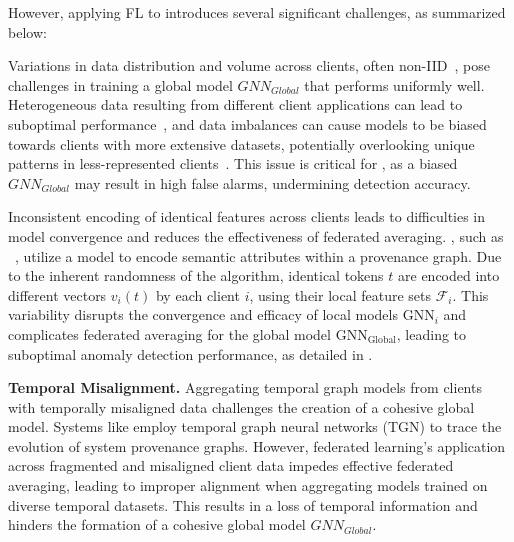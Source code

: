 However, applying FL to \pids introduces several significant challenges, as summarized below:

\begin{enumerate}[itemsep=0.1em, parsep=0em, topsep=0em, leftmargin=*]
   Variations in data distribution and volume across clients, often non-IID~\cite{zhao2018federated}, pose challenges in training a global model \( GNN_{Global} \) that performs uniformly well. Heterogeneous data resulting from different client applications can lead to suboptimal performance~\cite{qu2022rethinking}, and data imbalances can cause models to be biased towards clients with more extensive datasets, potentially overlooking unique patterns in less-represented clients~\cite{duan2020self}. This issue is critical for \pids, as a biased \( GNN_{Global} \) may result in high false alarms, undermining detection accuracy.

   Inconsistent encoding of identical features across clients leads to difficulties in model convergence and reduces the effectiveness of federated averaging. \pids, such as \flash~\cite{cheng2023kairos}, utilize a \wordvec model to encode semantic attributes within a provenance graph. Due to the inherent randomness of the \wordvec algorithm, identical tokens \( t \) are encoded into different vectors \( v_i(t) \) by each client \( i \), using their local feature sets \( \mathcal{F}_i \). This variability disrupts the convergence and efficacy of local \gnn models \( \text{GNN}_{i} \) and complicates federated averaging for the global \gnn model \( \text{GNN}_{\text{Global}} \), leading to suboptimal anomaly detection performance, as detailed in \cite{zhou2023fedfa}.

   {\bf Temporal Misalignment.} Aggregating temporal graph models from clients with temporally misaligned data challenges the creation of a cohesive global model. Systems like \kairos \cite{cheng2023kairos} employ temporal graph neural networks (TGN) to trace the evolution of system provenance graphs. However, federated learning's application across fragmented and misaligned client data impedes effective federated averaging, leading to improper alignment when aggregating models trained on diverse temporal datasets. This results in a loss of temporal information and hinders the formation of a cohesive global model \( GNN_{Global} \).
  
\end{enumerate}

